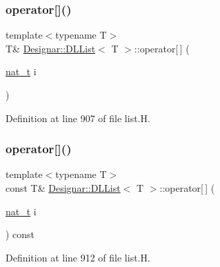 \subsubsection{\texorpdfstring{operator[]()}{operator[]()}\hspace{0.1cm}{\footnotesize\ttfamily [1/2]}}
{\footnotesize\ttfamily template$<$typename T$>$ \\
T\& \hyperlink{class_designar_1_1_d_l_list}{Designar\+::\+D\+L\+List}$<$ T $>$\+::operator\mbox{[}$\,$\mbox{]} (\begin{DoxyParamCaption}\item[{\hyperlink{namespace_designar_aa72662848b9f4815e7bf31a7cf3e33d1}{nat\+\_\+t}}]{i }\end{DoxyParamCaption})\hspace{0.3cm}{\ttfamily [inline]}}



Definition at line 907 of file list.\+H.

\mbox{\label{class_designar_1_1_d_l_list_a24b5b31952821f0d40fef5326ba635b3}} 
\subsubsection{\texorpdfstring{operator[]()}{operator[]()}\hspace{0.1cm}{\footnotesize\ttfamily [2/2]}}
{\footnotesize\ttfamily template$<$typename T$>$ \\
const T\& \hyperlink{class_designar_1_1_d_l_list}{Designar\+::\+D\+L\+List}$<$ T $>$\+::operator\mbox{[}$\,$\mbox{]} (\begin{DoxyParamCaption}\item[{\hyperlink{namespace_designar_aa72662848b9f4815e7bf31a7cf3e33d1}{nat\+\_\+t}}]{i }\end{DoxyParamCaption}) const\hspace{0.3cm}{\ttfamily [inline]}}



Definition at line 912 of file list.\+H.

\mbox{\label{class_designar_1_1_d_l_list_a6fd7f99c303dc6897a72dabd5f1f943d}} 
